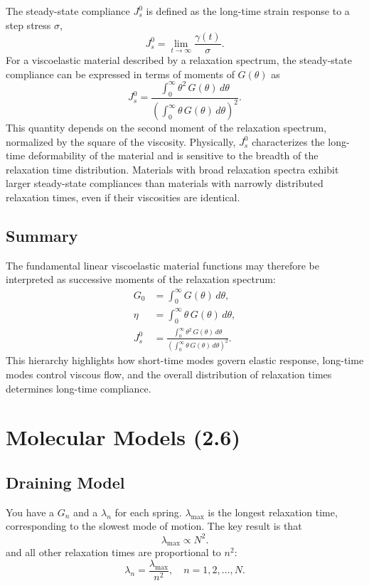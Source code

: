 The steady-state compliance $J_s^0$ is defined as the long-time strain response to a step stress $\sigma$,
\begin{equation}
	J_s^0 = \lim_{t \to \infty} \frac{\gamma(t)}{\sigma}.
\end{equation}
For a viscoelastic material described by a relaxation spectrum, the steady-state compliance can be expressed in terms of moments of $G(\theta)$ as
\begin{equation}
	J_s^0
	= \frac{\int_0^\infty \theta^2\, G(\theta)\, d\theta}
	{\left(\int_0^\infty \theta\, G(\theta)\, d\theta\right)^2}.
\end{equation}
This quantity depends on the second moment of the relaxation spectrum, normalized by the square of the viscosity. Physically, $J_s^0$ characterizes the long-time deformability of the material and is sensitive to the breadth of the relaxation time distribution. Materials with broad relaxation spectra exhibit larger steady-state compliances than materials with narrowly distributed relaxation times, even if their viscosities are identical.

\subsection{Summary}

The fundamental linear viscoelastic material functions may therefore be interpreted as successive moments of the relaxation spectrum:
\begin{align}
	G_0 &= \int_0^\infty G(\theta)\, d\theta, \\
	\eta &= \int_0^\infty \theta\, G(\theta)\, d\theta, \\
	J_s^0 &= \frac{\int_0^\infty \theta^2\, G(\theta)\, d\theta}
	{\left(\int_0^\infty \theta\, G(\theta)\, d\theta\right)^2}.
\end{align}
This hierarchy highlights how short-time modes govern elastic response, long-time modes control viscous flow, and the overall distribution of relaxation times determines long-time compliance.

\section{Molecular Models (2.6)}
\subsection{Draining Model}
You have a $G_n$ and a $\lambda_n$ for each spring. 
$\lambda_\text{max}$ is the longest relaxation time, corresponding to the slowest mode of motion.
The key result is that
\[
	\lambda_\text{max} \propto N^2.
\] 
and all other relaxation times are proportional to $n^2$:
\[
	\lambda_n = \frac{\lambda_\text{max}}{n^2}, \quad n=1,2,\ldots,N.
\]

